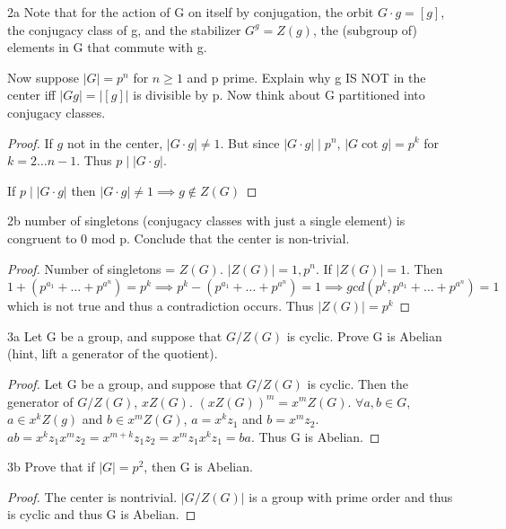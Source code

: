 \documentclass{article}
\newcommand{\abs}[1]{\lvert #1\rvert}
\begin{document}
\bigskip

\begin{PROB}{2a}\label{Problem 2a.}
    Note that for the action of G on itself by conjugation, the orbit $G \cdot g = [g]$, the conjugacy class of g, and the stabilizer $G^g = Z(g)$, the (subgroup of) elements in G that commute with g. 
    
    Now suppose $|G| = p^n$ for $n \geq 1$ and p prime. Explain why g IS NOT in the center iff $|G g| = |[g]|$ is divisible by p. Now think about G partitioned into conjugacy classes. 

\end{PROB}
\begin{proof}
    If $g$ not in the center, $|G \cdot g| \neq 1$. But since $|G \cdot g| \mid p^n$, $|G \cot g| = p^k$ for $k = 2 \ldots n - 1$. Thus $p \mid |G \cdot g|$. 

    If $p \mid |G \cdot g|$ then $|G \cdot g| \neq 1 \implies g \not \in Z(G)$
\end{proof}

\begin{PROB}{2b}\label{Problem 2b.}
    number of singletons (conjugacy classes with just a single element) is congruent to 0 mod p. Conclude that the center is non-trivial.
\end{PROB}
\begin{proof}
    Number of singletons = $Z(G)$. $\abs{Z(G)} = 1, p^n$. If $\abs{Z(G)} = 1$. Then $1 + (p^{a_1} + \ldots + p^{a^n}) = p^k \implies p^k - (p^{a_1} + \ldots + p^{a^n}) = 1 \implies gcd(p^k, p^{a_1} + \ldots + p^{a^n}) = 1$ which is not true and thus a contradiction occurs. Thus $\abs{Z(G)} = p^k$
\end{proof}

\begin{PROB}{3a}\label{Problem 3a.}
    Let G be a group, and suppose that $G/Z(G)$ is cyclic. Prove G is Abelian (hint, lift a generator of the quotient).
\end{PROB}
\begin{proof}
    Let G be a group, and suppose that $G/Z(G)$ is cyclic. Then the generator of $G/Z(G)$, $xZ(G)$. $(xZ(G))^m = x^mZ(G)$. $\forall a, b \in G$, $a \in x^kZ(g)$ and $b \in x^mZ(G)$, $a = x^kz_1$ and $b = x^mz_2$. $ab = x^kz_1x^mz_2 = x^{m+k}z_1z_2 = x^mz_1x^kz_1 = ba$. Thus G is Abelian.
\end{proof}

\bigskip

\begin{PROB}{3b}\label{Problem 3b.}
    Prove that if $|G| = p^2$, then G is Abelian.
\end{PROB}
\begin{proof}
    The center is nontrivial. $|G/Z(G)|$ is a group with prime order and thus is cyclic and thus G is Abelian.
\end{proof}
\end{document}
